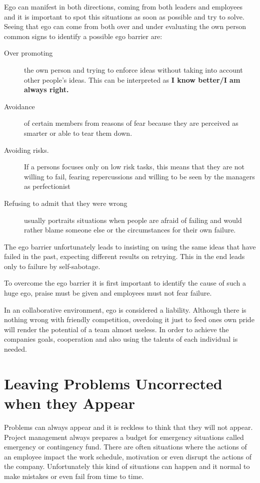 Ego can manifest in both directions, coming from both leaders and employees and it is important to spot this situations as soon as possible and try to solve. Seeing that ego can come from both over and under evaluating the own person common signs to identify a possible ego barrier are:
\begin{description}
\item [Over promoting] the own person and trying to enforce ideas without taking into account other people's ideas. This can be interpreted as \textbf{I know better/I am always right.}
\item [Avoidance] of certain members from reasons of fear because they are perceived as smarter or able to tear them down.
\item [Avoiding risks.] If a persons focuses only on low risk tasks, this means that they are not willing to fail, fearing repercussions and willing to be seen by the managers as perfectionist
\item [Refusing to admit that they were wrong] usually portraits situations when people are afraid of failing and would rather blame someone else or the circumstances for their own failure.
\end{description}

The ego barrier unfortunately leads to insisting on using the same ideas that have failed in the past, expecting different results on retrying. This in the end leads only to failure by self-sabotage.

To overcome the ego barrier it is first important to identify the cause of such a huge ego, praise must be given and employees must not fear failure.

In an collaborative environment, ego is considered a liability. Although there is nothing wrong with friendly competition, overdoing it just to feed ones own pride will render the potential of a team almost useless. In order  to achieve the companies goals, cooperation and also using the talents of each individual is needed. 

\section{Leaving Problems Uncorrected when they Appear}
\label{sec:uncorrected}
Problems can always appear and it is reckless to think that they will not appear. Project management always prepares a budget for emergency situations called  emergency or contingency fund.
There are often situations where the actions of an employee impact the work schedule, motivation or even disrupt the actions of the company. Unfortunately this kind of situations can happen and it normal to make mistakes or even fail from time to time. 

